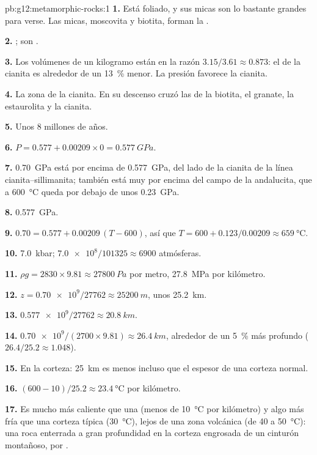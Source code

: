 \begin{solution}{pb:g12:metamorphic-rocks:1}
\textbf{1.} Está foliado, y sus micas son lo bastante grandes para verse. Las
micas, moscovita y biotita, forman la .

\textbf{2.} ; son .

\textbf{3.} Los volúmenes de un kilogramo están en la razón $3.15/3.61 \approx
0.873$: el de la cianita es alrededor de un \qty{13}{\percent} menor. La
presión favorece la cianita.

\textbf{4.} La zona de la cianita. En su descenso cruzó las  de la
biotita, el granate, la estaurolita y la cianita.

\textbf{5.} Unos 8 millones de años.

\textbf{6.} $P = 0.577 + 0.00209 \times 0 = \qty{0.577}{GPa}$.

\textbf{7.} \qty{0.70}{GPa} está por encima de \qty{0.577}{GPa}, del lado de
la cianita de la línea cianita--sillimanita; también está muy por encima del
campo de la andalucita, que a \qty{600}{\celsius} queda por debajo de unos
\qty{0.23}{GPa}.

\textbf{8.} \qty{0.577}{GPa}.

\textbf{9.} $0.70 = 0.577 + 0.00209\,(T - 600)$, así que $T = 600 +
0.123/0.00209 \approx \qty{659}{\celsius}$.

\textbf{10.} \qty{7.0}{kbar}; $\num{7.0e8}/101325 \approx \num{6900}$
atmósferas.

\textbf{11.} $\rho g = 2830 \times 9.81 \approx \qty{27800}{Pa}$ por metro,
\qty{27.8}{MPa} por kilómetro.

\textbf{12.} $z = \num{0.70e9}/\num{27762} \approx \qty{25200}{m}$, unos
\qty{25.2}{km}.

\textbf{13.} $\num{0.577e9}/\num{27762} \approx \qty{20.8}{km}$.

\textbf{14.} $\num{0.70e9}/(2700 \times 9.81) \approx \qty{26.4}{km}$, alrededor
de un \qty{5}{\percent} más profundo ($26.4/25.2 \approx 1.048$).

\textbf{15.} En la corteza: \qty{25}{km} es menos incluso que el espesor de
una corteza normal.

\textbf{16.} $(600 - 10)/25.2 \approx \qty{23.4}{\celsius}$ por kilómetro.

\textbf{17.} Es mucho más caliente que una  (menos de
\qty{10}{\celsius} por kilómetro) y algo más fría que una corteza típica
(\qty{30}{\celsius}), lejos de una zona volcánica (de 40 a \qty{50}{\celsius}):
una roca enterrada a gran profundidad en la corteza engrosada de un cinturón
montañoso, por .


\end{solution}
